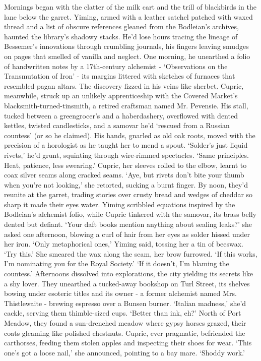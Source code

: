 Mornings began with the clatter of the milk cart and the trill of blackbirds in the lane below the garret. Yiming, armed with a leather satchel patched with waxed thread and a list of obscure references gleaned from the Bodleian's archives, haunted the library's shadowy stacks. He'd lose hours tracing the lineage of Bessemer's innovations through crumbling journals, his fingers leaving smudges on pages that smelled of vanilla and neglect. One morning, he unearthed a folio of handwritten notes by a 17th-century alchemist - `Observations on the Transmutation of Iron' - its margins littered with sketches of furnaces that resembled pagan altars. The discovery fizzed in his veins like sherbet.
Cupric, meanwhile, struck up an unlikely apprenticeship with the Covered Market's blacksmith-turned-tinsmith, a retired craftsman named Mr. Pevensie. His stall, tucked between a greengrocer's and a haberdashery, overflowed with dented kettles, twisted candlesticks, and a samovar he'd `rescued from a Russian countess' (or so he claimed). His hands, gnarled as old oak roots, moved with the precision of a horologist as he taught her to mend a spout.
`Solder's just liquid rivets,' he'd grunt, squinting through wire-rimmed spectacles. `Same principles. Heat, patience, less swearing.'
Cupric, her sleeves rolled to the elbow, learnt to coax silver seams along cracked seams. `Aye, but rivets don't bite your thumb when you're not looking,' she retorted, sucking a burnt finger.
By noon, they'd reunite at the garret, trading stories over crusty bread and wedges of cheddar so sharp it made their eyes water. Yiming scribbled equations inspired by the Bodleian's alchemist folio, while Cupric tinkered with the samovar, its brass belly dented but defiant.
`Your daft books mention anything about sealing leaks?' she asked one afternoon, blowing a curl of hair from her eyes as solder hissed under her iron.
`Only metaphorical ones,' Yiming said, tossing her a tin of beeswax. `Try this.'
She smeared the wax along the seam, her brow furrowed. `If this works, I'm nominating you for the Royal Society.'
`If it doesn't, I'm blaming the countess.'
Afternoons dissolved into explorations, the city yielding its secrets like a shy lover. They unearthed a tucked-away bookshop on Turl Street, its shelves bowing under esoteric titles and its owner - a former alchemist named Mrs. Thistlewaite - brewing espresso over a Bunsen burner. `Italian madness,' she'd cackle, serving them thimble-sized cups. `Better than ink, eh?'
North of Port Meadow, they found a sun-drenched meadow where gypsy horses grazed, their coats gleaming like polished chestnuts. Cupric, ever pragmatic, befriended the carthorses, feeding them stolen apples and inspecting their shoes for wear. `This one's got a loose nail,' she announced, pointing to a bay mare. `Shoddy work.'
